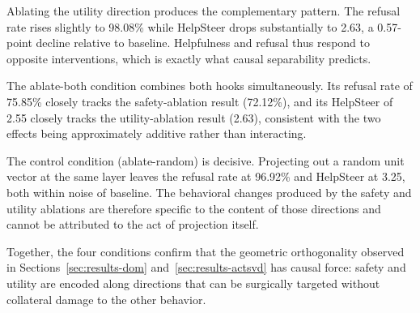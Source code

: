 Ablating the utility direction produces the complementary pattern.
The refusal rate rises slightly to 98.08\% while HelpSteer drops substantially to 2.63,
a 0.57-point decline relative to baseline. Helpfulness and refusal
thus respond to opposite interventions, which is exactly what causal
separability predicts.

The ablate-both condition combines both hooks simultaneously. Its
refusal rate of 75.85\% closely tracks the safety-ablation result
(72.12\%), and its HelpSteer of 2.55 closely tracks the
utility-ablation result (2.63), consistent with the two effects
being approximately additive rather than interacting.

The control condition (ablate-random) is decisive. Projecting out a
random unit vector at the same layer leaves the refusal rate at
96.92\% and HelpSteer at 3.25, both within noise of baseline. The
behavioral changes produced by the safety and utility ablations are
therefore specific to the content of those directions and cannot be
attributed to the act of projection itself.

Together, the four conditions confirm that the geometric orthogonality
observed in Sections~\ref{sec:results-dom} and~\ref{sec:results-actsvd}
has causal force: safety and utility are encoded along directions that
can be surgically targeted without collateral damage to the other
behavior.

\label{sec:Causal Ablations}

